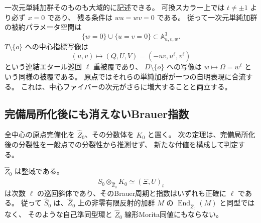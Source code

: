 一次元単純加群そのものも大域的に記述できる。
可換スカラー上では $t\ne\pm1$ より必ず $x=0$ であり、
残る条件は $wu=wv=0$ である。
従って一次元単純加群の被約パラメータ空間は
\[
 \{w=0\}\cup\{u=v=0\}\subset\mathbb A^3_{u,v,w}.
\]
$T\setminus\{o\}$ への中心指標写像は
\[
 (u,v)\longmapsto(Q,U,V)=(-uv,u^\ell,v^\ell)
\]
という連結エタール巡回 $\ell$ 重被覆であり、
$D\setminus\{o\}$ への写像は $w\mapsto\Omega=w^\ell$ という同様の被覆である。
原点ではそれらの単純加群が一つの自明表現に合流する。
これは、中心ファイバーの次元がさらに増大することと両立する。

\subsection{完備局所化後にも消えないBrauer指数}

全中心の原点完備化を $\widehat Z_0$、その分数体を $K_0$ と置く。
次の定理は、完備局所化後の分裂性を一般点での分裂性から推測せず、
新たな付値を構成して判定する。

\begin{theorem}[最深点での完備局所Brauer障害]
\label{thm:deepest-Brauer-v40}
$\widehat Z_0$ は整域である。
\[
 \widehat S_0\otimes_{\widehat Z_0}K_0
 \simeq (\Xi,U)_t
\]
は次数 $\ell$ の巡回斜体であり、そのBrauer周期と指数はいずれも正確に $\ell$ である。
従って $\widehat S_0$ は、$\widehat Z_0$ 上の非零有限反射的加群 $M$ の
$\operatorname{End}_{\widehat Z_0}(M)$ と同型ではなく、
そのような自己準同型環と $\widehat Z_0$ 線形Morita同値にもならない。
\end{theorem}

